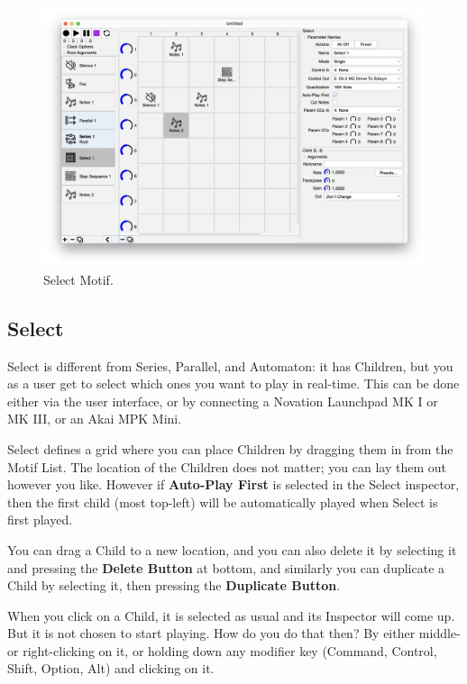 \documentclass[twoside,10pt]{article}
\begin{document}
\clearpage

\begin{figure}[t]
\centering
\includegraphics[width=6.5in]{Select}
\vspace{-2em}
\caption{Select Motif.}
\label{select}
\end{figure}

\subsection{Select}

Select is different from Series, Parallel, and Automaton: it has Children, but you as a user get to select which ones you want to play in real-time.  This can be done either via the user interface, or by connecting a Novation Launchpad MK I or MK III, or an Akai MPK Mini.

Select defines a grid where you can place Children by dragging them in from the Motif List.  The location of the Children does not matter; you can lay them out however you like.  However if {\bf Auto-Play First} is selected in the Select inspector, then the first child (most top-left) will be automatically played when Select is first played.

You can drag a Child to a new location, and you can also  delete it by selecting it and pressing the {\bf Delete Button} at bottom, and similarly you can duplicate a Child by selecting it, then pressing the {\bf Duplicate Button}. 

When you click on a Child, it is selected as usual and its Inspector will come up.  But it is not chosen to start playing.  How do you do that then?  By either middle- or right-clicking on it, or holding down any modifier key (Command, Control, Shift, Option, Alt) and clicking on it.
\end{document}

